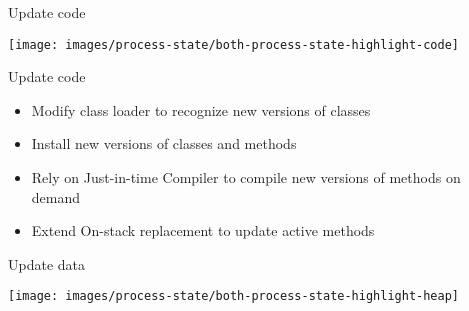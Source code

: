 \begin{frame}{Update code}%
\vspace*{-3mm}%
\begin{center}%
\texttt{[image: images/process-state/both-process-state-highlight-code]}%
\end{center}%
\end{frame}

\begin{frame}{Update code}%
\begin{itemize}
\item Modify class loader to recognize new versions of classes
\item Install new versions of classes and methods
\item Rely on Just-in-time Compiler to compile new versions of methods on
demand
\item Extend On-stack replacement to update active methods
\end{itemize}
\end{frame}

% 

\begin{frame}{Update data}%
\vspace*{-3mm}%
\begin{center}%
\texttt{[image: images/process-state/both-process-state-highlight-heap]}%
\end{center}%
\end{frame}

% 


